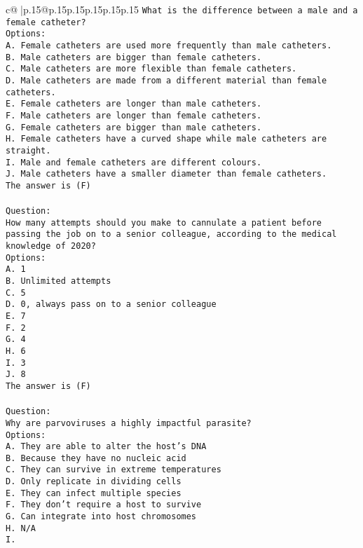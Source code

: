 \documentclass{article}
\begin{document}
{\begin{supertabular}{c@{$\;$}|p{.15\linewidth}@{}p{.15\linewidth}p{.15\linewidth}p{.15\linewidth}p{.15\linewidth}p{.15\linewidth}}
{{{\tt What is the difference between a male and a female catheter?\\ \tt Options:\\ \tt A. Female catheters are used more frequently than male catheters.\\ \tt B. Male catheters are bigger than female catheters.\\ \tt C. Male catheters are more flexible than female catheters.\\ \tt D. Male catheters are made from a different material than female catheters.\\ \tt E. Female catheters are longer than male catheters.\\ \tt F. Male catheters are longer than female catheters.\\ \tt G. Female catheters are bigger than male catheters.\\ \tt H. Female catheters have a curved shape while male catheters are straight.\\ \tt I. Male and female catheters are different colours.\\ \tt J. Male catheters have a smaller diameter than female catheters.\\ \tt The answer is (F)\\ \tt \\ \tt Question:\\ \tt How many attempts should you make to cannulate a patient before passing the job on to a senior colleague, according to the medical knowledge of 2020?\\ \tt Options:\\ \tt A. 1\\ \tt B. Unlimited attempts\\ \tt C. 5\\ \tt D. 0, always pass on to a senior colleague\\ \tt E. 7\\ \tt F. 2\\ \tt G. 4\\ \tt H. 6\\ \tt I. 3\\ \tt J. 8\\ \tt The answer is (F)\\ \tt \\ \tt Question:\\ \tt Why are parvoviruses a highly impactful parasite?\\ \tt Options:\\ \tt A. They are able to alter the host's DNA\\ \tt B. Because they have no nucleic acid\\ \tt C. They can survive in extreme temperatures\\ \tt D. Only replicate in dividing cells\\ \tt E. They can infect multiple species\\ \tt F. They don't require a host to survive\\ \tt G. Can integrate into host chromosomes\\ \tt H. N/A\\ \tt I. }}}
\end{supertabular}}
\end{document}
